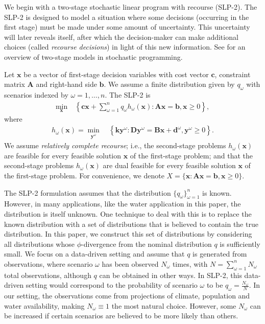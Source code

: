 \documentclass[11pt]{article}
\newcommand{\x}{\mathbf{x}}
\newcommand{\y}{\mathbf{y}}
\renewcommand{\c}{\mathbf{c}}
\newcommand{\A}{\mathbf{A}}
\renewcommand{\b}{\mathbf{b}}
\renewcommand{\k}{\mathbf{k}}
\newcommand{\D}{\mathbf{D}}
\newcommand{\B}{\mathbf{B}}
\renewcommand{\d}{\mathbf{d}}
\theoremstyle{plain}
\theoremstyle{definition}
\theoremstyle{remark}
\begin{document}
We begin with a two-stage stochastic linear program with recourse (SLP-2).
The SLP-2 is designed to model a situation where some decisions (occurring in the first stage) must be made under some amount of uncertainty.
This uncertainty will later reveals itself, after which the decision-maker can make additional choices (called \emph{recourse decisions}) in light of this new information.
See \citep{ruszczynski2003stochastic} for an overview of two-stage models in stochastic programming.

Let $\x$ be a vector of first-stage decision variables with cost vector $\c$, constraint matrix $\A$ and right-hand side $\b$.
We assume a finite distribution given by $q_\omega$ with scenarios indexed by $\omega = 1, \dots, n$.
The SLP-2 is
\begin{align}
	\min_\x \ & \left\{ \c\x + \sum_{\omega=1}^n q_\omega h_\omega(\x) : \A\x = \b, \x \geq 0 \right\}, \label{eq:slp_first_stage_water}
\end{align}
where
\begin{align}
	h_\omega(\x) = \min_{\y^\omega} \ & \left\{ \k \y^\omega : \D \y^\omega = \B \x + \d^\omega, \y^\omega \geq 0 \right\}. \label{eq:slp_second_stage_water}
\end{align}
We assume \emph{relatively complete recourse}; i.e., the second-stage problems $h_\omega(\x)$ are feasible for every feasible solution $\x$ of the first-stage problem; and that the second-stage problems $h_\omega(\x)$ are dual feasible for every feasible solution $\x$ of the first-stage problem.
For convenience, we denote $X = \{\x : \A\x = \b, \x \geq 0\}$.

The SLP-2 formulation assumes that the distribution $\{q_\omega\}_{\omega=1}^n$ is known.
However, in many applications, like the water application in this paper, the distribution is itself unknown.
One technique to deal with this is to replace the known distribution with a set of distributions that is believed to contain the true distribution.
In this paper, we construct this set of distributions by considering all distributions whose $\phi$-divergence from the nominal distribution $q$ is sufficiently small.
We focus on a data-driven setting and assume that $q$ is generated from observations, where scenario $\omega$ has been observed $N_\omega$ times, with $N = \sum_{\omega=1}^n N_\omega$ total observations, although $q$ can be obtained in other ways.
In SLP-2, this data-driven setting would correspond to the probability of scenario $\omega$ to be $q_\omega = \frac{N_\omega}{N}$.
In our setting, the observations come from projections of climate, population and water availability, making $N_\omega \equiv 1$ the most natural choice.
However, some $N_\omega$ can be increased if certain scenarios are believed to be more likely than others.
\end{document}
